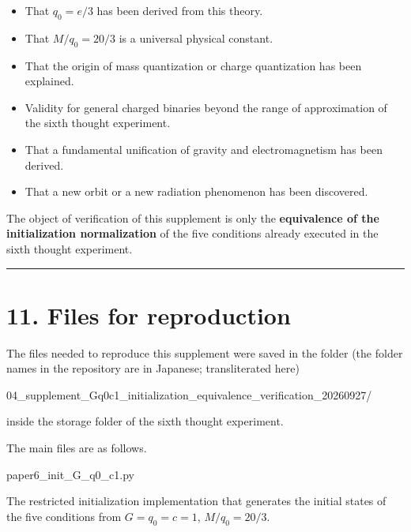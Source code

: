 \documentclass[
  a4paper,
]{article}
\newenvironment{Shaded}{}{}
\newcommand{\NormalTok}[1]{#1}
\providecommand{\tightlist}{%
  \setlength{\itemsep}{0pt}\setlength{\parskip}{0pt}}
\begin{document}
\begin{itemize}
\tightlist
\item
  That \(q_0=e/3\) has been derived from this theory.
\item
  That \(M/q_0=20/3\) is a universal physical constant.
\item
  That the origin of mass quantization or charge quantization has been
  explained.
\item
  Validity for general charged binaries beyond the range of
  approximation of the sixth thought experiment.
\item
  That a fundamental unification of gravity and electromagnetism has
  been derived.
\item
  That a new orbit or a new radiation phenomenon has been discovered.
\end{itemize}

The object of verification of this supplement is only the
\textbf{equivalence of the initialization normalization} of the five
conditions already executed in the sixth thought experiment.

\begin{center}\rule{0.5\linewidth}{0.5pt}\end{center}

\section{11. Files for reproduction}\label{files-for-reproduction}

The files needed to reproduce this supplement were saved in the folder
(the folder names in the repository are in Japanese; transliterated
here)

\begin{Shaded}
\begin{Highlighting}[]
\NormalTok{04\_supplement\_Gq0c1\_initialization\_equivalence\_verification\_20260927/}
\end{Highlighting}
\end{Shaded}

inside the storage folder of the sixth thought experiment.

The main files are as follows.

\begin{Shaded}
\begin{Highlighting}[]
\NormalTok{paper6\_init\_G\_q0\_c1.py}
\end{Highlighting}
\end{Shaded}

The restricted initialization implementation that generates the initial
states of the five conditions from \(G=q_0=c=1\), \(M/q_0=20/3\).
\end{document}
